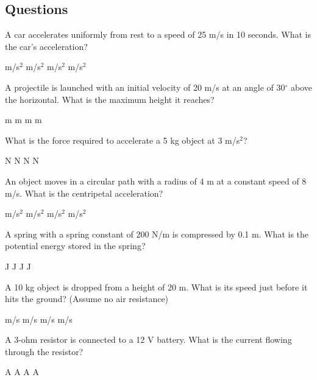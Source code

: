 \documentclass[addpoints]{exam}
\begin{document}
\newpage
\begin{questions}

\section*{Questions}

\question[1] A car accelerates uniformly from rest to a speed of 25 m/s in 10 seconds. What is the car's acceleration?
\begin{choices}
     m/s$^2$
     m/s$^2$
     m/s$^2$
     m/s$^2$
\end{choices}

\question[1] A projectile is launched with an initial velocity of 20 m/s at an angle of 30$^\circ$ above the horizontal. What is the maximum height it reaches?
\begin{choices}
     m
     m
     m
     m
\end{choices}

\question[1] What is the force required to accelerate a 5 kg object at 3 m/s$^2$?
\begin{choices}
     N
     N
     N
     N
\end{choices}

\question[1] An object moves in a circular path with a radius of 4 m at a constant speed of 8 m/s. What is the centripetal acceleration?
\begin{choices}
     m/s$^2$
     m/s$^2$
     m/s$^2$
     m/s$^2$
\end{choices}

\question[1] A spring with a spring constant of 200 N/m is compressed by 0.1 m. What is the potential energy stored in the spring?
\begin{choices}
     J
     J
     J
     J
\end{choices}

\question[1] A 10 kg object is dropped from a height of 20 m. What is its speed just before it hits the ground? (Assume no air resistance)
\begin{choices}
     m/s
     m/s
     m/s
     m/s
\end{choices}

\question[1] A 3-ohm resistor is connected to a 12 V battery. What is the current flowing through the resistor?
\begin{choices}
     A
     A
     A
     A
\end{choices}


\end{questions}
\end{document}
